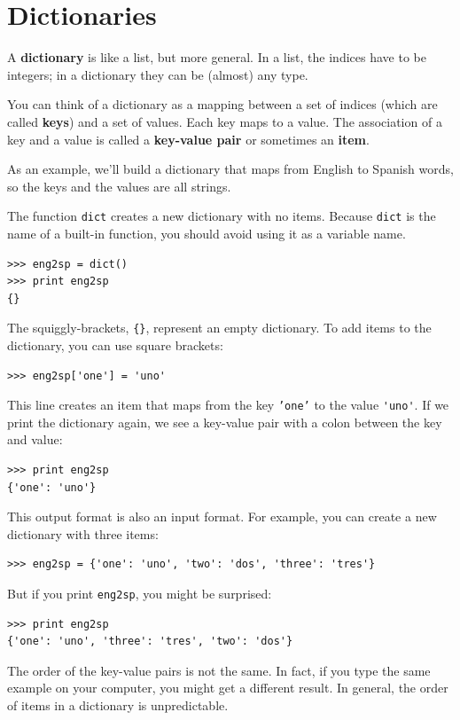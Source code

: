 \documentclass[10pt]{book}
\begin{document}
\chapter{Dictionaries}

A {\bf dictionary} is like a list, but more general.  In a list,
the indices have to be integers; in a dictionary they can
be (almost) any type.

You can think of a dictionary as a mapping between a set of indices
(which are called {\bf keys}) and a set of values.  Each key maps to a
value.  The association of a key and a value is called a {\bf
  key-value pair} or sometimes an {\bf item}.

As an example, we'll build a dictionary that maps from English
to Spanish words, so the keys and the values are all strings.

The function {\tt dict} creates a new dictionary with no items.
Because {\tt dict} is the name of a built-in function, you
should avoid using it as a variable name.

\begin{verbatim}
>>> eng2sp = dict()
>>> print eng2sp
{}
\end{verbatim}

The squiggly-brackets, \verb"{}", represent an empty dictionary.
To add items to the dictionary, you can use square brackets:

\begin{verbatim}
>>> eng2sp['one'] = 'uno'
\end{verbatim}
%
This line creates an item that maps from the key
{\tt 'one'} to the value \verb"'uno'".  If we print the
dictionary again, we see a key-value pair with a colon
between the key and value:

\begin{verbatim}
>>> print eng2sp
{'one': 'uno'}
\end{verbatim}
%
This output format is also an input format.  For example,
you can create a new dictionary with three items:

\begin{verbatim}
>>> eng2sp = {'one': 'uno', 'two': 'dos', 'three': 'tres'}
\end{verbatim}
%
But if you print {\tt eng2sp}, you might be surprised:

\begin{verbatim}
>>> print eng2sp
{'one': 'uno', 'three': 'tres', 'two': 'dos'}
\end{verbatim}
%
The order of the key-value pairs is not the same.  In fact, if
you type the same example on your computer, you might get a
different result.  In general, the order of items in
a dictionary is unpredictable.
\end{document}
